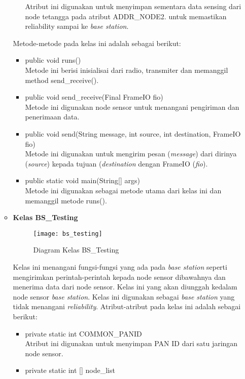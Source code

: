 \begin{itemize}
\begin{itemize}
\begin{itemize}
            Atribut ini digunakan untuk menyimpan sementara data sensing dari node tetangga pada atribut ADDR\_NODE2. untuk memastikan reliability sampai ke \textit{base station}.
        \end{itemize}
        Metode-metode pada kelas ini adalah sebagai berikut:
        \begin{itemize}
            \item public void runs()\\
            Metode ini berisi inisialisai dari radio, transmiter dan memanggil method send\_receive().
            \item public void send\_receive(Final FrameIO fio)\\
            Metode ini digunakan node sensor untuk menangani pengiriman dan penerimaan data.
            \item public void send(String message, int source, int destination, FrameIO fio)\\
            Metode ini digunakan untuk mengirim pesan (\textit{message}) dari dirinya (\textit{source}) kepada tujuan (\textit{destination} dengan FrameIO (\textit{fio}).
            \item public static void main(String[] args)\\
            Metode ini digunakan sebagai metode utama dari kelas ini dan memanggil metode runs().
        \end{itemize}
        \item \textbf{Kelas BS\_Testing}\\
        \begin{figure}[h]
        	\centering
        	\texttt{[image: bs\_testing]}
        	\caption{Diagram Kelas BS\_Testing}
        	\label{fig:bs_testing}
        \end{figure}
        Kelas ini menangani fungsi-fungsi yang ada pada \textit{base station} seperti mengirimkan perintah-perintah kepada node sensor dibawahnya dan menerima data dari node sensor. Kelas ini yang akan diunggah kedalam node sensor \textit{base station}. Kelas ini digunakan sebagai \textit{base station} yang tidak menangani \textit{reliability}. Atribut-atribut pada kelas ini adalah sebagai berikut:
        \begin{itemize}
            \item private static int COMMON\_PANID\\
            Atribut ini digunakan untuk menyimpan PAN ID dari satu jaringan node sensor.
            \item private static int [] node\_list\\

\end{itemize}
\end{itemize}
\end{itemize}
